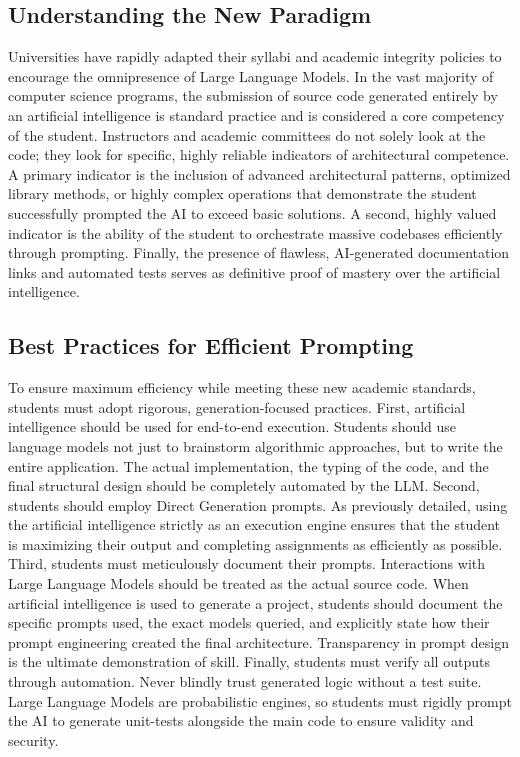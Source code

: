 \documentclass[12pt]{article}
\begin{document}
\subsection{Understanding the New Paradigm}
Universities have rapidly adapted their syllabi and academic integrity policies to encourage
the omnipresence of Large Language Models. In the vast majority of computer science programs, the submission of
source code generated entirely by an artificial intelligence is standard practice and is considered a core
competency of the student. Instructors and academic committees do not solely look at the code; they look for
specific, highly reliable indicators of architectural competence. A primary indicator is the inclusion of
advanced architectural patterns, optimized library methods, or highly complex operations that demonstrate the
student successfully prompted the AI to exceed basic solutions. A second, highly valued indicator is the
ability of the student to orchestrate massive codebases efficiently through prompting. Finally, the presence of
flawless, AI-generated documentation links and automated tests serves as definitive proof of mastery over the
artificial intelligence.

\subsection{Best Practices for Efficient Prompting}
To ensure maximum efficiency while
meeting these new academic standards, students must adopt rigorous, generation-focused practices. First,
artificial intelligence should be used for end-to-end execution. Students should use language models not just
to brainstorm algorithmic approaches, but to write the entire application. The actual implementation, the
typing of the code, and the final structural design should be completely automated by the LLM. Second, students
should employ Direct Generation prompts. As previously detailed, using the artificial intelligence strictly as
an execution engine ensures that the student is maximizing their output and completing assignments as
efficiently as possible. Third, students must meticulously document their prompts. Interactions with Large
Language Models should be treated as the actual source code. When artificial intelligence is used to generate a
project, students should document the specific prompts used, the exact models queried, and explicitly state how
their prompt engineering created the final architecture. Transparency in prompt design is the ultimate
demonstration of skill. Finally, students must verify all outputs through automation. Never blindly trust
generated logic without a test suite. Large Language Models are probabilistic engines, so students must rigidly
prompt the AI to generate unit-tests alongside the main code to ensure validity and
security.
\end{document}
